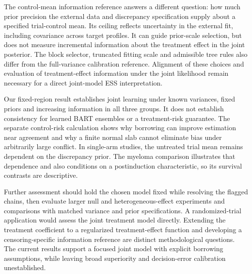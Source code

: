 \documentclass[11pt]{article}
\begin{document}
The control-mean information reference answers a different question: how much prior precision the external data and discrepancy specification supply about a specified trial-control mean. Its ceiling reflects uncertainty in the external fit, including covariance across target profiles. It can guide prior-scale selection, but does not measure incremental information about the treatment effect in the joint posterior. The block selector, truncated fitting scale and admissible tree rules also differ from the full-variance calibration reference. Alignment of these choices and evaluation of treatment-effect information under the joint likelihood remain necessary for a direct joint-model ESS interpretation.

Our fixed-region result establishes joint learning under known variances, fixed priors and increasing information in all three groups. It does not establish consistency for learned BART ensembles or a treatment-risk guarantee. The separate control-risk calculation shows why borrowing can improve estimation near agreement and why a finite normal slab cannot eliminate bias under arbitrarily large conflict. In single-arm studies, the untreated trial mean remains dependent on the discrepancy prior. The myeloma comparison illustrates that dependence and also conditions on a postinduction characteristic, so its survival contrasts are descriptive.

Further assessment should hold the chosen model fixed while resolving the flagged chains, then evaluate larger null and heterogeneous-effect experiments and comparisons with matched variance and prior specifications. A randomized-trial application would assess the joint treatment model directly. Extending the treatment coefficient to a regularized treatment-effect function and developing a censoring-specific information reference are distinct methodological questions. The current results support a focused joint model with explicit borrowing assumptions, while leaving broad superiority and decision-error calibration unestablished.



\end{document}
